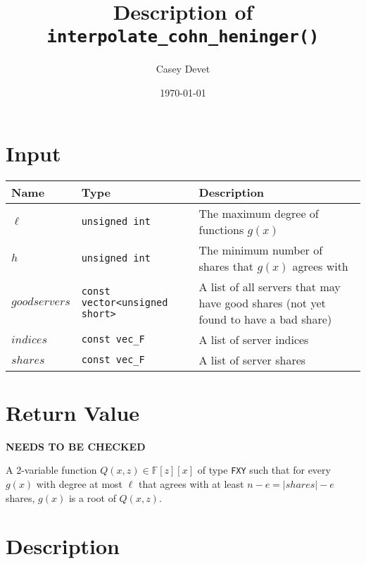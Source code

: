 \documentclass[10pt]{article}
\newcommand{\barred}[1]
	{\left| #1 \right|}
\begin{document}
\pagestyle{fancy}


\setlength{\parindent}{0pt}


\title{\textbf{Description of \texttt{interpolate\_cohn\_heninger()}}}
\date{\today}
\author{Casey Devet}

\maketitle
\thispagestyle{fancy}

\setlength{\parskip}{12pt}

\section*{Input}

\begin{tabular}{p{.9in}p{2.1in}p{3in}}
\textbf{Name} & \textbf{Type} & \textbf{Description} \\ \hline
$\ell$ & \texttt{unsigned int} & The maximum degree of functions $g(x)$ \\
$h$ & \texttt{unsigned int} & The minimum number of shares that $g(x)$ agrees with \\
$goodservers$ & \texttt{const vector<unsigned short>} & A list of all servers that may have good shares 
		(not yet found to have a bad share) \\
$indices$ & \texttt{const vec\_F} & A list of server indices \\
$shares$ & \texttt{const vec\_F} & A list of server shares \\
\end{tabular}

\section*{Return Value}

\textbf{NEEDS TO BE CHECKED}

A 2-variable function $Q(x,z) \in \mathbb{F}[z][x]$ of type \texttt{FXY} such that for every $g(x)$ with degree at most $\ell$ that
agrees with at least $n-e=\barred{shares}-e$ shares, $g(x)$ is a root of $Q(x,z)$.

\section*{Description}
\end{document}
